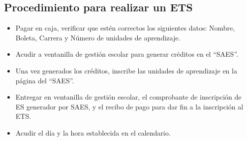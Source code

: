 \subsection{Procedimiento para realizar un ETS}
\begin{itemize}
	\item Pagar en caja, verificar que estén correctos los siguientes datos: Nombre, Boleta, Carrera y Número de unidades de aprendizaje.
	\item Acudir a ventanilla de gestión escolar para generar créditos en el “SAES”.
	\item Una vez generados los créditos, inscribe las unidades de aprendizaje en la página del “SAES”.
	\item Entregar en ventanilla de gestión escolar, el comprobante de inscripción de ES generador por SAES, y el recibo de pago para dar fin a la inscripción al ETS. 
	\item  Acudir el día y la hora establecida en el calendario.
\end{itemize}